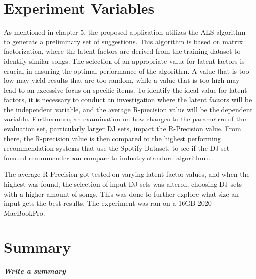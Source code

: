 \section{Experiment Variables}

As mentioned in chapter 5, the proposed application utilizes the ALS algorithm to generate a preliminary set of suggestions. This algorithm is based on matrix factorization, where the latent factors are derived from the training dataset to identify similar songs. The selection of an appropriate value for latent factors is crucial in ensuring the optimal performance of the algorithm. A value that is too low may yield results that are too random, while a value that is too high may lead to an excessive focus on specific items. To identify the ideal value for latent factors, it is necessary to conduct an  investigation where the latent factors will be the independent variable, and the average R-precision value will be the dependent variable. Furthermore, an examination on how changes to the parameters of the evaluation set, particularly larger DJ sets, impact the R-Precision value. From there, the R-precision value  is then compared to the highest performing recommendation systems that use the Spotify Dataset, to see if the DJ set focused recommender can compare to industry standard algorithms.

The average R-Precision got tested on varying latent factor values, and when the highest was found, the selection of input DJ sets was altered, choosing DJ sets with a higher amount of songs. This was done to further explore what size an input gets the best results. The experiment was ran on a 16GB 2020 MacBookPro.

\section{Summary}
\textbf{\textit{Write a summary}}
